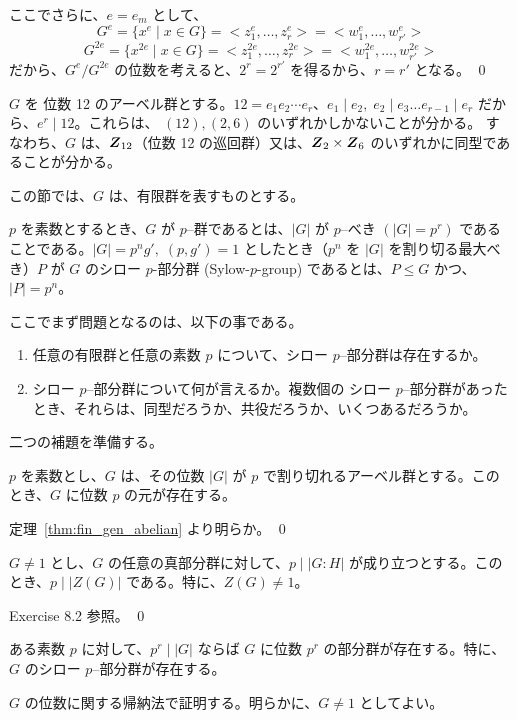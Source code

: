 ここでさらに、$e = e_m$ として、
$$G^e = \{x^e\mid x\in G\} = <z_1^{e},\ldots, z_r^{e}> = <w_{1}^{e},\ldots,w_{r'}^{e}>$$
$$G^{2e} = \{x^{2e}\mid x\in G\} = <z_1^{2e},\ldots, z_r^{2e}> = <w_{1}^{2e},\ldots,w_{r'}^{2e}>$$
だから、$G^e/G^{2e}$ の位数を考えると、$2^r = 2^{r'}$ を得るから、$r = r'$ となる。
\qed

\begin{eg}
$G$ を 位数 12 のアーベル群とする。$12 = e_1e_2\cdots e_r$、$e_1\mid e_2,\;e_2\mid e_3 \ldots e_{r-1}\mid e_r$ だから、$e^{r}\mid 12$。これらは、
$(12), (2,6)$ のいずれかしかないことが分かる。
すなわち、$G$ は、$\mbox{\boldmath $Z$}_{12}$（位数 12 の巡回群）又は、$\mbox{\boldmath $Z$}_2\times \mbox{\boldmath $Z$}_6$ のいずれかに同型であることが分かる。
\end{eg} 

\newpage
{}
この節では、$G$ は、有限群を表すものとする。

\begin{definition}
$p$ を素数とするとき、$G$ が $p$--群であるとは、$|G|$ が $p$--べき $(|G| = p^r)$ であることである。$|G| = p^ng',\;(p,g') = 1$ としたとき（$p^n$ を $|G|$ を割り切る最大べき）$P$ が $G$ のシロー $p$-部分群 (Sylow-$p$-group) であるとは、$P\leq G$  かつ、$|P| = p^n$。
\end{definition}

ここでまず問題となるのは、以下の事である。
\begin{enumerate}
\item 任意の有限群と任意の素数 $p$ について、シロー $p$--部分群は存在するか。
\item シロー $p$--部分群について何が言えるか。複数個の シロー $p$--部分群があったとき、それらは、同型だろうか、共役だろうか、いくつあるだろうか。
\end{enumerate}

二つの補題を準備する。
\begin{lemma} \label{lemma:p-ele_in_abelian}
$p$ を素数とし、$G$ は、その位数 $|G|$ が $p$ で割り切れるアーベル群とする。このとき、$G$ に位数 $p$ の元が存在する。
\end{lemma}
\proof
定理~\ref{thm:fin_gen_abelian} より明らか。
\qed

\begin{lemma} \label{lemma:nontrivial_center}
$G\neq 1$ とし、$G$ の任意の真部分群に対して、$p\mid |G:H|$ が成り立つとする。このとき、$p\mid |Z(G)|$ である。特に、$Z(G)\neq 1$。
\end{lemma}
\proof
Exercise 8.2 参照。
\qed

\begin{thm} \label{thm:sylow:existence}
ある素数 $p$ に対して、$p^r \mid |G|$ ならば $G$ に位数 $p^r$ の部分群が存在する。特に、$G$ のシロー $p$--部分群が存在する。
\end{thm}
\proof
$G$ の位数に関する帰納法で証明する。明らかに、$G\neq 1$ としてよい。

